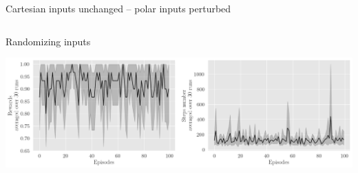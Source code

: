 \documentclass[bigger]{beamer}
\begin{document}
\begin{frame}[label={sec:org2846752}]{Cartesian inputs unchanged -- polar inputs perturbed}
\begin{columns}
\begin{column}[c]{0.5\columnwidth}
\begin{center}
\end{center}
\begin{center}
\footnotesize
Randomizing inputs
\end{center}
\begin{center}
\includegraphics[width=\textwidth]{medias/LeftRight/exp_keep-cartesian_silence-False.png}
\end{center}
\end{column}
\end{columns}
\end{frame}
\end{document}

